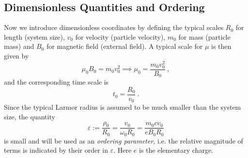\documentclass{scrartcl}
\begin{document}
\subsection{Dimensionless Quantities and Ordering}

Now we introduce dimensionless coordinates by defining the typical scales $R_0$ for length (system size), $v_0$ for velocity (particle velocity), $m_0$ for mass (particle mass) and $B_0$ for magnetic field (external field). A typical scale for $\mu$ is then given by
\begin{equation*}
\mu_0 B_0 = m_0 v_0^2 \implies \mu_0 = \frac{m_0v_0^2}{B_0} \ ,
\end{equation*}
and the corresponding time scale is
\begin{equation*}
t_0 = \frac{R_0}{v_0} \ .
\end{equation*}
Since the typical Larmor radius is assumed to be much smaller than the system size, the quantity
\begin{equation}
\varepsilon := \frac{\rho_0}{R_0} = \frac{v_0}{\omega_0R_0} = \frac{m_0 c v_0}{eB_0 R_0}
\end{equation}
is small and will be used as an \emph{ordering parameter}, i.e. the relative magnitude of terms is indicated by their order in $\varepsilon$. Here $e$ is the elementary charge.
\end{document}
